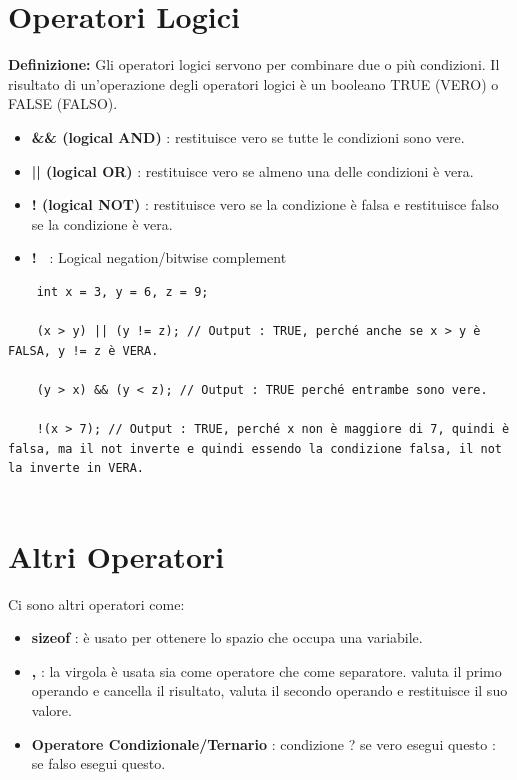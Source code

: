 
\section{Operatori Logici}

\textsf{\small \textbf{Definizione: } Gli operatori logici servono per combinare due o più condizioni. Il risultato di un'operazione degli operatori logici è un booleano TRUE (VERO) o FALSE (FALSO).} \\

\begin{itemize}
	\item \textsf{\small \textbf{\&\& (logical AND)} : restituisce vero se tutte le condizioni sono vere.}
	\item \textsf{\small \textbf{|| (logical OR)} : restituisce vero se almeno una delle condizioni è vera.}
	\item \textsf{\small \textbf{! (logical NOT)} : restituisce vero se la condizione è falsa e restituisce falso se la condizione è vera.}
	\item \textsf{\small \textbf{!~} : Logical negation/bitwise complement} 
\end{itemize}

\begin{lstlisting}
	int x = 3, y = 6, z = 9;
	
	(x > y) || (y != z); // Output : TRUE, perché anche se x > y è FALSA, y != z è VERA.
	
	(y > x) && (y < z); // Output : TRUE perché entrambe sono vere.
	
	!(x > 7); // Output : TRUE, perché x non è maggiore di 7, quindi è falsa, ma il not inverte e quindi essendo la condizione falsa, il not la inverte in VERA.
	
\end{lstlisting}


\section{Altri Operatori}

\textsf{\small Ci sono altri operatori come: } \\

\begin{itemize}
	\item \textsf{\small \textbf{sizeof} : è usato per ottenere lo spazio che occupa una variabile.}
	\item \textsf{\small \textbf{,} : la virgola è usata sia come operatore che come separatore. valuta il primo operando e cancella il risultato, valuta il secondo operando e restituisce il suo valore.}
	\item \textsf{\small \textbf{Operatore Condizionale/Ternario} : condizione ? se vero esegui questo : se falso esegui questo.}
\end{itemize}

